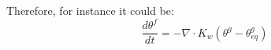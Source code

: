 Therefore, for instance it could be:
\begin{equation}
\frac{d \theta^f}{dt} = - {\nabla}\cdot  K_w ({\theta^g - \theta^g_{eq}})
\end{equation}